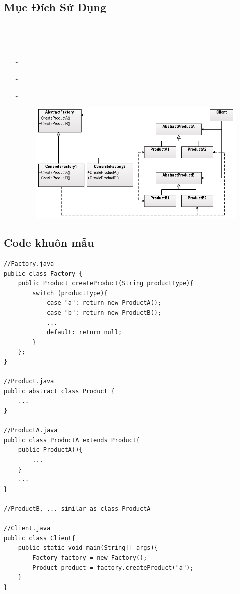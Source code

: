 \documentclass{article}
\newcommand\subpara{\fontsize{13}{13}\selectfont \fontseries{b}\selectfont}
\begin{document}
    \subsection{Mục Đích Sử Dụng}
    \begin{itemize}
        \item[-]\subpara{Tạo ra cách mới trong việc khởi tạo đối tượng thông qua một interface chung}
        \item[-]\subpara{Che giấu đi xử lý logic của việc khởi tạo đối tượng}
        \item[-]\subpara{Giảm sự phụ thuộc giữa các module và tăng tính mở rộng code}
        \item[-]\subpara{Khi Factory có quá nhiều trường hợp, sử dụng Abstract Factory giúp phân tách điều kiện đơn giản hóa logic. Theo như mô hình ở dưới, AbtractFactory sẽ lựa chọn ConcreteFactory kế thừa từ mình để tạo ra Product}
        \item[-]\subpara{Mô hình cho Abstract Factory:}
        \begin{figure}[htp]
            \includegraphics[scale=0.7]{./image/abstract-factory-pattern.png}
        \end{figure}
    \end{itemize}


    \subsection{Code khuôn mẫu}
    \begin{lstlisting}
//Factory.java
public class Factory {
    public Product createProduct(String productType){
        switch (productType){
            case "a": return new ProductA();
            case "b": return new ProductB();
            ...
            default: return null;
        }
    };
}

//Product.java
public abstract class Product {
    ...
}

//ProductA.java
public class ProductA extends Product{
    public ProductA(){
        ...
    }
    ...
}

//ProductB, ... similar as class ProductA

//Client.java
public class Client{
    public static void main(String[] args){
        Factory factory = new Factory();
        Product product = factory.createProduct("a");
    }
}
    \end{lstlisting}
\end{document}

